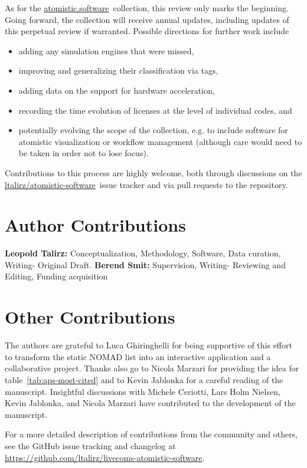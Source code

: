 \documentclass[9pt,review]{livecoms}
\newcommand{\githubrepository}{\url{https://github.com/ltalirz/livecoms-atomistic-software}}  %
\newcommand{\atsoft}{\href{https://atomistic.software}{atomistic.software}\ }
\newcommand{\atsoftgit}{\href{https://github.com/ltalirz/atomistic-software}{ltalirz/atomistic-software}\ }
\begin{document}
As for the \atsoft collection, this review only marks the beginning.
Going forward, the collection will receive annual updates, including updates of this perpetual review if warranted.
Possible directions for further work include
\begin{itemize}
    \item 
adding any simulation engines that were missed, 
    \item 
improving and generalizing their classification via tags,
    \item 
adding data on the support for hardware acceleration,
    \item 
recording the time evolution of licenses at the level of individual codes, and
    \item 
potentially evolving the scope of the collection, e.g. to include software for atomistic visualization or workflow management (although care would need to be taken in order not to lose focus).
\end{itemize}
Contributions to this process are highly welcome, both through discussions on the \atsoftgit issue tracker and via pull requests to the repository.










\section{Author Contributions}
\textbf{Leopold Talirz:} Conceptualization, Methodology, Software, Data curation, Writing- Original Draft.
\textbf{Berend Smit:} Supervision, Writing- Reviewing and Editing, Funding acquisition


\section{Other Contributions}
The authors are grateful to Luca Ghiringhelli for being supportive of this effort to transform the static NOMAD list into an interactive application and a collaborative project.
Thanks also go to Nicola Marzari for providing the idea for table~\ref{tab:aps-most-cited} and to Kevin Jablonka for a careful reading of the manuscript.
Insightful discussions with Michele Ceriotti, Lars Holm Nielsen, Kevin Jablonka, and Nicola Marzari have contributed to the development of the manuscript.

For a more detailed description of contributions from the community and others, see the GitHub issue tracking and changelog at \githubrepository.
\end{document}
